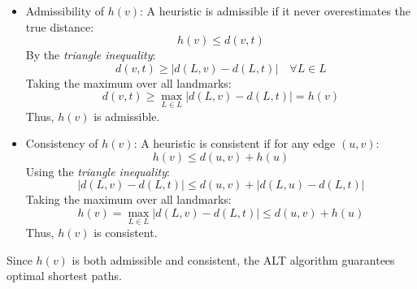 \begin{appendices}
\begin{itemize}
	\item Admissibility of $h(v)$: A heuristic is admissible if it never overestimates the true distance:  
	\begin{equation*} h(v) \leq d(v, t) \end{equation*}
	By the \textit{triangle inequality}: \begin{equation*} d(v, t) \geq |d(L, v) - d(L, t)| \quad \forall L \in L \end{equation*}
	Taking the maximum over all landmarks:
	\begin{equation*}
		d(v, t) \geq \max_{L \in \textit{L}} \left| d(L, v) - d(L, t) \right| = h(v)
	\end{equation*}
	Thus, $ h(v) $ is admissible.
	\item Consistency of $h(v)$: A heuristic is consistent if for any edge $ (u, v) $:
	\begin{equation*}
		h(v) \leq d(u, v) + h(u)
	\end{equation*}
	Using the \textit{triangle inequality}:
	\begin{equation*} 
		|d(L, v) - d(L, t)| \leq d(u, v) + |d(L, u) - d(L, t)| 
	\end{equation*}
	Taking the maximum over all landmarks:
	\begin{equation*}
		h(v) = \max_{L \in \textit{L}} \left| d(L, v) - d(L, t) \right| \leq d(u, v) + h(u)
	\end{equation*}
	Thus, $ h(v) $ is consistent.
\end{itemize}
Since $ h(v) $ is both admissible and consistent, the ALT algorithm guarantees optimal shortest paths.


\end{appendices}
